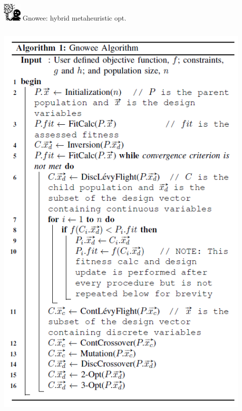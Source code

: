 \documentclass[xcolor=x11names,compress]{beamer}
\renewcommand{\(}{\begin{columns}}
\renewcommand{\)}{\end{columns}}
\newcommand{\<}[1]{\begin{column}{#1}}
\renewcommand{\>}{\end{column}}
\begin{document}
\begin{frame}{\includegraphics[width=0.35in]{../figs/Gnowee.png} \hspace{0.25cm}  Gnowee: hybrid metaheuristic opt.}
\begin{columns}
    \begin{column}{0.4\linewidth}
      \includegraphics[width=0.95\textwidth]{../figs/GnoweeAlgorithm.png}
    \end{column}
  \end{columns}
\end{frame}
\end{document}
